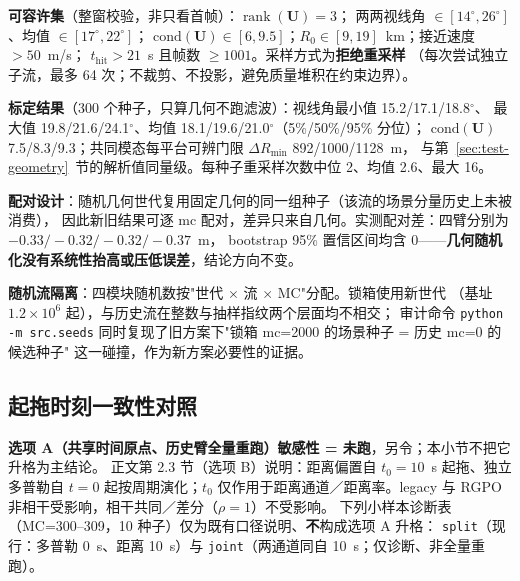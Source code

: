 \documentclass[UTF8,a4paper,zihao=-4]{ctexart}
\begin{document}
\textbf{可容许集}（整窗校验，非只看首帧）：\(\operatorname{rank}(\boldsymbol U)=3\)；
两两视线角 \(\in[14^\circ,26^\circ]\)、均值 \(\in[17^\circ,22^\circ]\)；
\(\mathrm{cond}(\boldsymbol U)\in[6,9.5]\)；\(R_0\in[9,19]\)~km；接近速度 \(>50\)~m/s；
\(t_{\mathrm{hit}}>21\)~s 且帧数 \(\ge1001\)。采样方式为\textbf{拒绝重采样}
（每次尝试独立子流，最多 64 次；不裁剪、不投影，避免质量堆积在约束边界）。

\textbf{标定结果}（300 个种子，只算几何不跑滤波）：视线角最小值 15.2/17.1/18.8$^\circ$、
最大值 19.8/21.6/24.1$^\circ$、均值 18.1/19.6/21.0$^\circ$（5\%/50\%/95\% 分位）；
\(\mathrm{cond}(\boldsymbol U)\) 7.5/8.3/9.3；共同模态每平台可辨门限 \(\Delta R_{\min}\) 892/1000/1128~m，
与第~\ref{sec:test-geometry}~节的解析值同量级。每种子重采样次数中位 2、均值 2.6、最大 16。

\textbf{配对设计}：随机几何世代复用固定几何的同一组种子（该流的场景分量历史上未被消费），
因此新旧结果可逐 mc 配对，差异只来自几何。实测配对差：四臂分别为 \(-0.33/-0.32/-0.32/-0.37\)~m，
bootstrap 95\% 置信区间均含 0——\textbf{几何随机化没有系统性抬高或压低误差}，结论方向不变。

\textbf{随机流隔离}：四模块随机数按"世代 $\times$ 流 $\times$ MC"分配。锁箱使用新世代
（基址 \(1.2\times10^{6}\) 起），与历史流在整数与抽样指纹两个层面均不相交；
审计命令 \texttt{python -m src.seeds} 同时复现了旧方案下"锁箱 mc=2000 的场景种子 = 历史 mc=0 的候选种子"
这一碰撞，作为新方案必要性的证据。

\subsection{起拖时刻一致性对照}\label{sup:timebase-audit}

\textbf{选项 A（共享时间原点、历史臂全量重跑）敏感性 = 未跑}，另令；本小节不把它升格为主结论。
正文第 2.3 节（选项 B）说明：距离偏置自 $t_0=10$~s 起拖、独立多普勒自 $t=0$ 起按周期演化；$t_0$ 仅作用于距离通道／距离率。legacy 与 RGPO 非相干受影响，相干共同／差分（$\rho=1$）不受影响。
下列小样本诊断表（MC=300--309，10 种子）仅为既有口径说明、\textbf{不}构成选项 A 升格：
\texttt{split}（现行：多普勒 0~s、距离 10~s）与 \texttt{joint}（两通道同自 10~s；仅诊断、非全量重跑）。
\end{document}
